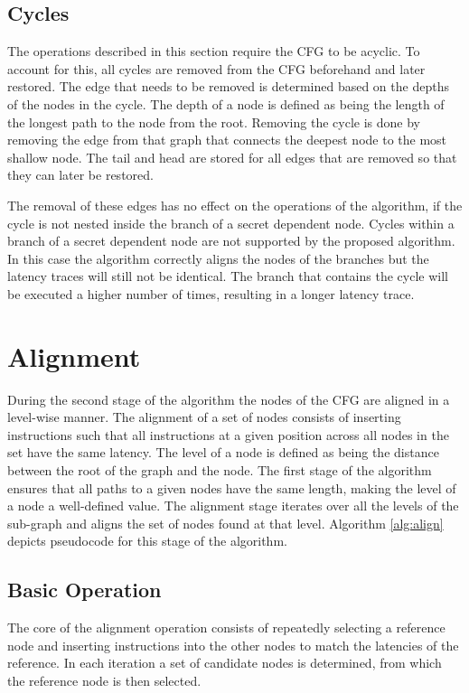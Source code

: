\subsection{Cycles}
The operations described in this section require the CFG to be acyclic.
To account for this, all cycles are removed from the CFG beforehand and later restored. 
The edge that needs to be removed is determined based on the depths of the nodes in the cycle. 
The depth of a node is defined as being the length of the longest path to the node from the root. 
Removing the cycle is done by removing the edge from that graph that connects the deepest node to the most shallow node. 
The tail and head are stored for all edges that are removed so that they can later be restored. 

The removal of these edges has no effect on the operations of the algorithm, if the cycle is not nested inside the branch of a secret dependent node.  
Cycles within a branch of a secret dependent node are not supported by the proposed algorithm.
In this case the algorithm correctly aligns the nodes of the branches but the latency traces will still not be identical.
The branch that contains the cycle will be executed a higher number of times, resulting in a longer latency trace. 


\section{Alignment} \label{seq:alignment}
During the second stage of the algorithm the nodes of the CFG are aligned in a level-wise manner. 
The alignment of a set of nodes consists of inserting instructions such that all instructions at a given position across all nodes in the set have the same latency. 
The level of a node is defined as being the distance between the root of the graph and the node. The first stage of the algorithm ensures that all paths to a given nodes have the same length,
making the level of a node a well-defined value. 
The alignment stage iterates over all the levels of the sub-graph and aligns the set of nodes found at that level. Algorithm \ref{alg:align} depicts pseudocode for this stage of the algorithm.

\subsection{Basic Operation}
The core of the alignment operation consists of repeatedly selecting a reference node and inserting instructions into the other nodes to match the latencies of the reference. 
In each iteration a set of candidate nodes is determined, from which the reference node is then selected. 

